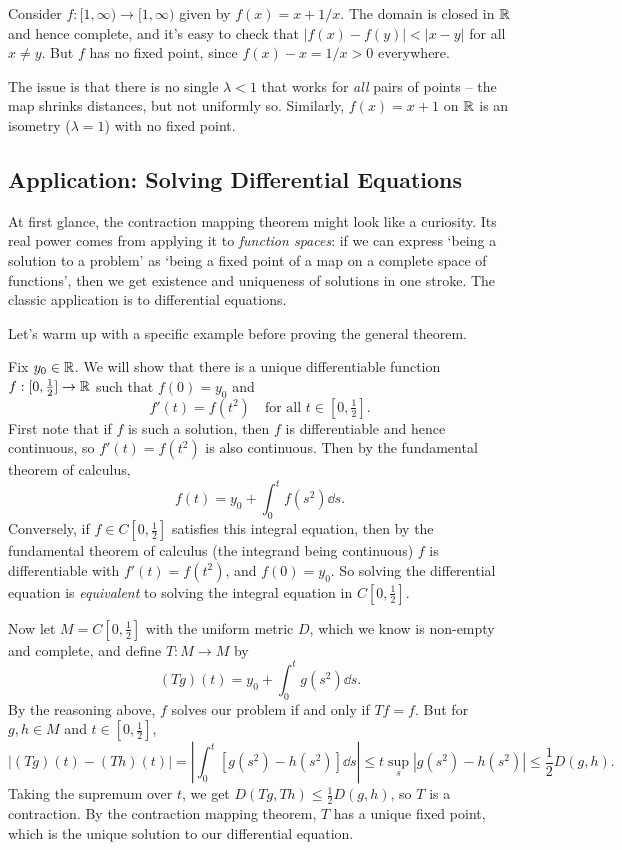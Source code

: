 \documentclass[a4paper]{scrartcl}
\begin{document}
\begin{example}
    Consider $f: [1, \infty) \rightarrow [1, \infty)$ given by $f(x) = x + 1/x$. The domain is closed in $\mathbb{R}$ and hence complete, and it's easy to check that $|f(x) - f(y)| < |x - y|$ for all $x \neq y$. But $f$ has no fixed point, since $f(x) - x = 1/x > 0$ everywhere.

    The issue is that there is no single $\lambda < 1$ that works for \emph{all} pairs of points -- the map shrinks distances, but not uniformly so. Similarly, $f(x) = x + 1$ on $\mathbb{R}$ is an isometry ($\lambda = 1$) with no fixed point.
\end{example}

\subsection{Application: Solving Differential Equations}

At first glance, the contraction mapping theorem might look like a curiosity. Its real power comes from applying it to \emph{function spaces}: if we can express `being a solution to a problem' as `being a fixed point of a map on a complete space of functions', then we get existence and uniqueness of solutions in one stroke. The classic application is to differential equations.

Let's warm up with a specific example before proving the general theorem.

\begin{example}
    Fix $y_0 \in \mathbb{R}$. We will show that there is a unique differentiable function $f: [0, \tfrac{1}{2}] \rightarrow \mathbb{R}$ such that $f(0) = y_0$ and
    $$
    f'(t) = f(t^2) \quad \text{for all } t \in [0, \tfrac{1}{2}].
    $$
    First note that if $f$ is such a solution, then $f$ is differentiable and hence continuous, so $f'(t) = f(t^2)$ is also continuous. Then by the fundamental theorem of calculus,
    $$
    f(t) = y_0 + \int_0^t f(s^2) \dd s.
    $$
    Conversely, if $f \in C[0, \tfrac{1}{2}]$ satisfies this integral equation, then by the fundamental theorem of calculus (the integrand being continuous) $f$ is differentiable with $f'(t) = f(t^2)$, and $f(0) = y_0$. So solving the differential equation is \emph{equivalent} to solving the integral equation in $C[0, \tfrac{1}{2}]$.

    Now let $M = C[0, \tfrac{1}{2}]$ with the uniform metric $D$, which we know is non-empty and complete, and define $T: M \rightarrow M$ by
    $$
    (Tg)(t) = y_0 + \int_0^t g(s^2) \dd s.
    $$
    By the reasoning above, $f$ solves our problem if and only if $Tf = f$. But for $g, h \in M$ and $t \in [0, \tfrac{1}{2}]$,
    $$
    |(Tg)(t) - (Th)(t)| = \left| \int_0^t \left[g(s^2) - h(s^2)\right] \dd s \right| \leq t \sup_{s} |g(s^2) - h(s^2)| \leq \frac{1}{2} D(g, h).
    $$
    Taking the supremum over $t$, we get $D(Tg, Th) \leq \frac{1}{2} D(g, h)$, so $T$ is a contraction. By the contraction mapping theorem, $T$ has a unique fixed point, which is the unique solution to our differential equation.
\end{example}
\end{document}
